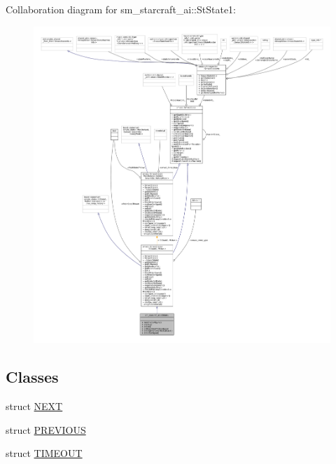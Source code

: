 Collaboration diagram for sm\+\_\+starcraft\+\_\+ai\+:\+:St\+State1\+:
\nopagebreak
\begin{figure}[H]
\begin{center}
\leavevmode
\includegraphics[width=350pt]{structsm__starcraft__ai_1_1StState1__coll__graph}
\end{center}
\end{figure}
\subsection*{Classes}
\begin{DoxyCompactItemize}
\item 
struct \hyperlink{structsm__starcraft__ai_1_1StState1_1_1NEXT}{N\+E\+XT}
\item 
struct \hyperlink{structsm__starcraft__ai_1_1StState1_1_1PREVIOUS}{P\+R\+E\+V\+I\+O\+US}
\item 
struct \hyperlink{structsm__starcraft__ai_1_1StState1_1_1TIMEOUT}{T\+I\+M\+E\+O\+UT}
\end{DoxyCompactItemize}
